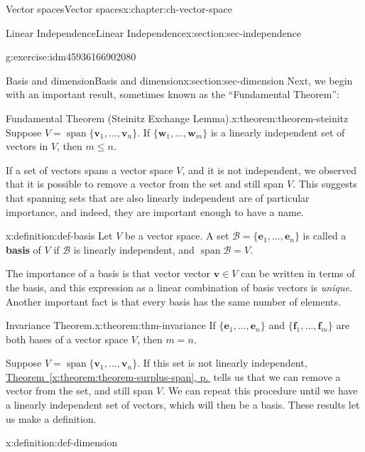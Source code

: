 \documentclass[oneside,10pt,]{book}
\newcommand{\xreffont}{\relax}
\newcommand{\terminology}[1]{\textbf{#1}}
\numberwithin{equation}{section}
\newcommand{\spn}{\operatorname{span}}
\newcommand{\vv}{\mathbf{v}}
\newcommand{\ww}{\mathbf{w}}
\begin{document}
\begin{chapterptx}{Vector spaces}{}{Vector spaces}{}{}{x:chapter:ch-vector-space}
\begin{sectionptx}{Linear Independence}{}{Linear Independence}{}{}{x:section:sec-independence}
\begin{inlineexercise}{}{g:exercise:idm45936166902080}
\end{inlineexercise}%
\end{sectionptx}
%
%
\typeout{************************************************}
\typeout{************************************************}
%
\begin{sectionptx}{Basis and dimension}{}{Basis and dimension}{}{}{x:section:sec-dimension}
Next, we begin with an important result, sometimes known as the ``Fundamental Theorem'':%
\begin{theorem}{Fundamental Theorem (Steinitz Exchange Lemma).}{}{x:theorem:theorem-steinitz}%
Suppose \(V = \spn\{\vv_1,\ldots, \vv_n\}\). If \(\{\ww_1,\ldots, \ww_m\}\) is a linearly independent set of vectors in \(V\), then \(m\leq n\).%
\end{theorem}
If a set of vectors spans a vector space \(V\), and it is not independent, we observed that it is possible to remove a vector from the set and still span \(V\). This suggests that spanning sets that are also linearly independent are of particular importance, and indeed, they are important enough to have a name.%
\begin{definition}{}{x:definition:def-basis}%
Let \(V\) be a vector space. A set \(\mathcal{B}=\{\mathbf{e}_1,\ldots, \mathbf{e}_n\}\) is called a \terminology{basis} of \(V\) if \(\mathcal{B}\) is linearly independent, and \(\operatorname{span}\mathcal{B} = V\).%
\end{definition}
The importance of a basis is that vector vector \(\vv\in V\) can be written in terms of the basis, and this expression as a linear combination of basis vectors is \emph{unique}. Another important fact is that every basis has the same number of elements.%
\begin{theorem}{Invariance Theorem.}{}{x:theorem:thm-invariance}%
If \(\{\mathbf{e}_1,\ldots, \mathbf{e}_n\}\) and \(\{\mathbf{f}_1,\ldots, \mathbf{f}_m\}\) are both bases of a vector space \(V\), then \(m=n\).%
\end{theorem}
Suppose \(V=\spn\{\vv_1,\ldots,\vv_n\}\). If this set is not linearly independent, \hyperref[x:theorem:theorem-surplus-span]{Theorem~{\xreffont\ref{x:theorem:theorem-surplus-span}}, p.\,\pageref{x:theorem:theorem-surplus-span}} tells us that we can remove a vector from the set, and still span \(V\). We can repeat this procedure until we have a linearly independent set of vectors, which will then be a basis. These results let us make a definition.%
\begin{definition}{}{x:definition:def-dimension}%

\end{definition}
\end{sectionptx}
\end{chapterptx}
\end{document}
